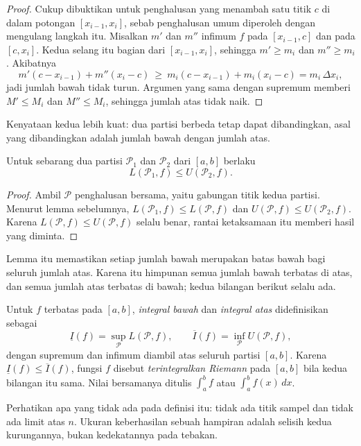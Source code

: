 \begin{proof}
Cukup dibuktikan untuk penghalusan yang menambah satu titik $c$ di dalam potongan
$[x_{i-1},x_i]$, sebab penghalusan umum diperoleh dengan mengulang langkah itu.
Misalkan $m'$ dan $m''$ infimum $f$ pada $[x_{i-1},c]$ dan pada $[c,x_i]$. Kedua
selang itu bagian dari $[x_{i-1},x_i]$, sehingga $m'\ge m_i$ dan $m''\ge m_i$.
Akibatnya
\[
m'(c-x_{i-1})+m''(x_i-c)\ \ge\ m_i(c-x_{i-1})+m_i(x_i-c)=m_i\,\Delta x_i ,
\]
jadi jumlah bawah tidak turun. Argumen yang sama dengan supremum memberi $M'\le M_i$
dan $M''\le M_i$, sehingga jumlah atas tidak naik.
\end{proof}

Kenyataan kedua lebih kuat: dua partisi berbeda tetap dapat dibandingkan, asal yang
dibandingkan adalah jumlah bawah dengan jumlah atas.

\begin{lemma}
Untuk sebarang dua partisi $\mathcal{P}_1$ dan $\mathcal{P}_2$ dari $[a,b]$ berlaku
\[
L(\mathcal{P}_1,f)\le U(\mathcal{P}_2,f).
\]
\end{lemma}

\begin{proof}
Ambil $\mathcal{P}$ penghalusan bersama, yaitu gabungan titik kedua partisi. Menurut
lemma sebelumnya, $L(\mathcal{P}_1,f)\le L(\mathcal{P},f)$ dan
$U(\mathcal{P},f)\le U(\mathcal{P}_2,f)$. Karena $L(\mathcal{P},f)\le U(\mathcal{P},f)$
selalu benar, rantai ketaksamaan itu memberi hasil yang diminta.
\end{proof}

Lemma itu memastikan setiap jumlah bawah merupakan batas bawah bagi seluruh jumlah
atas. Karena itu himpunan semua jumlah bawah terbatas di atas, dan semua jumlah atas
terbatas di bawah; kedua bilangan berikut selalu ada.

\begin{definisi}
Untuk $f$ terbatas pada $[a,b]$, \emph{integral bawah} dan \emph{integral atas}
didefinisikan sebagai
\[
\underline{I}(f)=\sup_{\mathcal{P}}L(\mathcal{P},f),
\qquad
\overline{I}(f)=\inf_{\mathcal{P}}U(\mathcal{P},f),
\]
dengan supremum dan infimum diambil atas seluruh partisi $[a,b]$. Karena
$\underline{I}(f)\le\overline{I}(f)$, fungsi $f$ disebut \emph{terintegralkan Riemann}
pada $[a,b]$ bila kedua bilangan itu sama. Nilai bersamanya ditulis
$\int_a^b f$ atau $\int_a^b f(x)\,dx$.
\end{definisi}

Perhatikan apa yang tidak ada pada definisi itu: tidak ada titik sampel dan tidak ada
limit atas $n$. Ukuran keberhasilan sebuah hampiran adalah selisih kedua kurungannya,
bukan kedekatannya pada tebakan.


